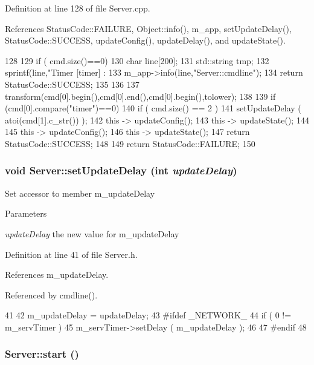 Definition at line 128 of file Server.cpp.

References StatusCode::FAILURE, Object::info(), m\_\-app, setUpdateDelay(), StatusCode::SUCCESS, updateConfig(), updateDelay(), and updateState().


\begin{DoxyCode}
128                                                         {  
129   if ( cmd.size()==0){
130     char line[200];
131     std::string tmp;
132     sprintf(line,"Timer    [timer]    : %
133     m_app->info(line,"Server::cmdline");
134     return StatusCode::SUCCESS;
135   }
136   
137   transform(cmd[0].begin(),cmd[0].end(),cmd[0].begin(),tolower);
138 
139   if (cmd[0].compare("timer")==0){
140     if ( cmd.size() == 2 ) {
141       setUpdateDelay ( atoi(cmd[1].c_str()) );
142       this -> updateConfig();
143       this -> updateState();  
144     }
145     this -> updateConfig();
146     this -> updateState();
147     return StatusCode::SUCCESS;
148   }
149   return StatusCode::FAILURE;
150 }
\end{DoxyCode}
\hypertarget{classServer_ac885fb635733c69a28fe3ec9bd21eac5}{
\subsubsection[{setUpdateDelay}]{\setlength{\rightskip}{0pt plus 5cm}void Server::setUpdateDelay (int {\em updateDelay})}}
\label{classServer_ac885fb635733c69a28fe3ec9bd21eac5}
Set accessor to member m\_\-updateDelay 
\begin{DoxyParams}{Parameters}
\item[{\em updateDelay}]the new value for m\_\-updateDelay \end{DoxyParams}


Definition at line 41 of file Server.h.

References m\_\-updateDelay.

Referenced by cmdline().


\begin{DoxyCode}
41                                         {
42     m_updateDelay = updateDelay;
43 #ifdef _NETWORK_
44     if ( 0 != m_servTimer ){
45       m_servTimer->setDelay ( m_updateDelay );
46     }
47 #endif
48   }
\end{DoxyCode}
\hypertarget{classServer_a039cc5b24c26fa5bb8145335f27bb28e}{
\subsubsection[{start}]{ Server::start ()}}
\label{classServer_a039cc5b24c26fa5bb8145335f27bb28e}


